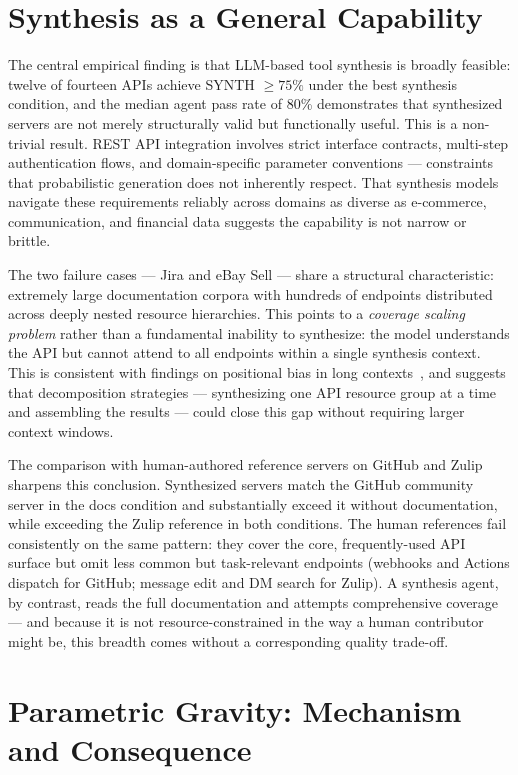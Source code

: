 \documentclass[12pt]{report}
\begin{document}
\section{Synthesis as a General Capability}

The central empirical finding is that LLM-based tool synthesis is broadly
feasible: twelve of fourteen APIs achieve SYNTH $\geq 75\%$ under the
best synthesis condition, and the median agent pass rate of 80\% demonstrates
that synthesized servers are not merely structurally valid but functionally
useful. This is a non-trivial result. REST API integration involves strict
interface contracts, multi-step authentication flows, and domain-specific
parameter conventions --- constraints that probabilistic generation does not
inherently respect. That synthesis models navigate these requirements reliably
across domains as diverse as e-commerce, communication, and financial data
suggests the capability is not narrow or brittle.

The two failure cases --- Jira and eBay Sell --- share a structural
characteristic: extremely large documentation corpora with hundreds of
endpoints distributed across deeply nested resource hierarchies. This points
to a \emph{coverage scaling problem} rather than a fundamental inability to
synthesize: the model understands the API but cannot attend to all endpoints
within a single synthesis context. This is consistent with findings on
positional bias in long contexts~\cite{liu2023lostmiddle,disentanglerecall2025},
and suggests that decomposition strategies --- synthesizing one API resource
group at a time and assembling the results --- could close this gap without
requiring larger context windows.

The comparison with human-authored reference servers on GitHub and Zulip
sharpens this conclusion. Synthesized servers match the GitHub community
server in the docs condition and substantially exceed it without documentation,
while exceeding the Zulip reference in both conditions. The human references
fail consistently on the same pattern: they cover the core, frequently-used
API surface but omit less common but task-relevant endpoints (webhooks and
Actions dispatch for GitHub; message edit and DM search for Zulip). A
synthesis agent, by contrast, reads the full documentation and attempts
comprehensive coverage --- and because it is not resource-constrained in the
way a human contributor might be, this breadth comes without a corresponding
quality trade-off.

\section{Parametric Gravity: Mechanism and Consequence}
\end{document}
